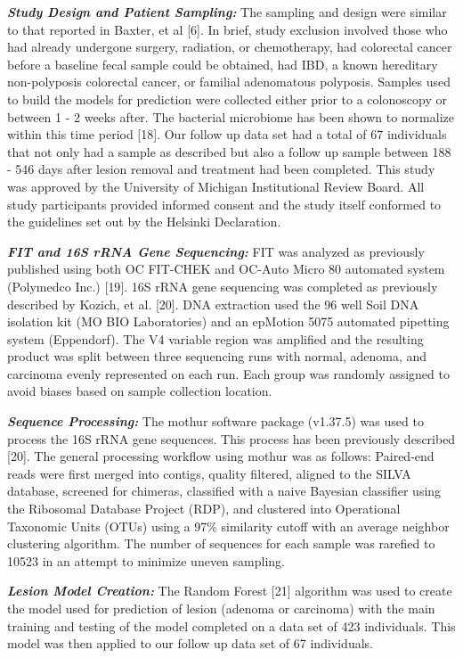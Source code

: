 \documentclass[12pt,]{article}
\begin{document}
\textbf{\emph{Study Design and Patient Sampling:}} The sampling and
design were similar to that reported in Baxter, et al {[}6{]}. In brief,
study exclusion involved those who had already undergone surgery,
radiation, or chemotherapy, had colorectal cancer before a baseline
fecal sample could be obtained, had IBD, a known hereditary
non-polyposis colorectal cancer, or familial adenomatous polyposis.
Samples used to build the models for prediction were collected either
prior to a colonoscopy or between 1 - 2 weeks after. The bacterial
microbiome has been shown to normalize within this time period {[}18{]}.
Our follow up data set had a total of 67 individuals that not only had a
sample as described but also a follow up sample between 188 - 546 days
after lesion removal and treatment had been completed. This study was
approved by the University of Michigan Institutional Review Board. All
study participants provided informed consent and the study itself
conformed to the guidelines set out by the Helsinki Declaration.

\textbf{\emph{FIT and 16S rRNA Gene Sequencing:}} FIT was analyzed as
previously published using both OC FIT-CHEK and OC-Auto Micro 80
automated system (Polymedco Inc.) {[}19{]}. 16S rRNA gene sequencing was
completed as previously described by Kozich, et al. {[}20{]}. DNA
extraction used the 96 well Soil DNA isolation kit (MO BIO Laboratories)
and an epMotion 5075 automated pipetting system (Eppendorf). The V4
variable region was amplified and the resulting product was split
between three sequencing runs with normal, adenoma, and carcinoma evenly
represented on each run. Each group was randomly assigned to avoid
biases based on sample collection location.

\textbf{\emph{Sequence Processing:}} The mothur software package
(v1.37.5) was used to process the 16S rRNA gene sequences. This process
has been previously described {[}20{]}. The general processing workflow
using mothur was as follows: Paired-end reads were first merged into
contigs, quality filtered, aligned to the SILVA database, screened for
chimeras, classified with a naive Bayesian classifier using the
Ribosomal Database Project (RDP), and clustered into Operational
Taxonomic Units (OTUs) using a 97\% similarity cutoff with an average
neighbor clustering algorithm. The number of sequences for each sample
was rarefied to 10523 in an attempt to minimize uneven sampling.

\textbf{\emph{Lesion Model Creation:}} The Random Forest {[}21{]}
algorithm was used to create the model used for prediction of lesion
(adenoma or carcinoma) with the main training and testing of the model
completed on a data set of 423 individuals. This model was then applied
to our follow up data set of 67 individuals.
\end{document}
